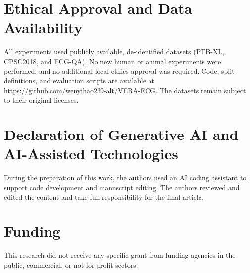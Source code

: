 \documentclass[preprint,12pt]{elsarticle}
\begin{document}
\section*{Ethical Approval and Data Availability}
All experiments used publicly available, de-identified datasets (PTB-XL, CPSC2018, and ECG-QA). No new human or animal experiments were performed, and no additional local ethics approval was required. Code, split definitions, and evaluation scripts are available at \url{https://github.com/wenyihao239-alt/VERA-ECG}. The datasets remain subject to their original licenses.

\section*{Declaration of Generative AI and AI-Assisted Technologies}
During the preparation of this work, the authors used an AI coding assistant to support code development and manuscript editing. The authors reviewed and edited the content and take full responsibility for the final article.

\section*{Funding}
This research did not receive any specific grant from funding agencies in the public, commercial, or not-for-profit sectors.
\end{document}
